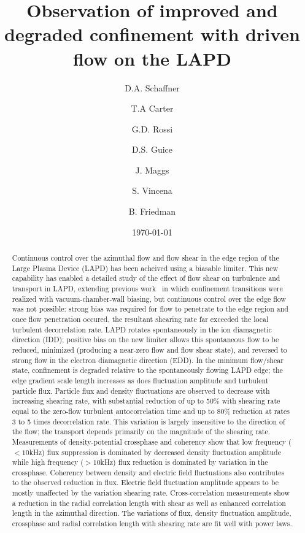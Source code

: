 \documentclass[%
 aps,
 prl,
 amsmath,amssymb,
 reprint,%
]{revtex4-1}
\begin{document}
\title{Observation of improved and degraded confinement with driven flow on the LAPD}
\author{D.A. Schaffner}
\author{T.A Carter}
\author{G.D. Rossi}
\author{D.S. Guice}
\author{J. Maggs}
\author{S. Vincena}
\author{B. Friedman}

\date{\today}%

\begin{abstract}
Continuous control over the azimuthal flow and flow shear in the edge region of the Large Plasma Device (LAPD) has been acheived using a biasable limiter.    This new capability has enabled a detailed study of
the effect of flow shear on turbulence and transport in LAPD,
extending previous work~\cite{carter09} in which confinement
transitions were realized with vacuum-chamber-wall biasing, but continuous control over
the edge flow was not possible: strong bias was required for flow to
penetrate to the edge region and once flow penetration occured, the
resultant shearing rate far exceeded the local turbulent decorrelation
rate.  LAPD rotates spontaneously in the ion diamagnetic direction
(IDD); positive bias on the new limiter allows this spontaneous
flow to be reduced, minimized (producing a near-zero flow and flow
shear state), and reversed to strong flow in the electron diamagnetic
direction (EDD). In the minimum flow/shear state, confinement is degraded relative to the spontaneously flowing LAPD edge;  the edge gradient scale
length increases as does fluctuation amplitude and turbulent particle flux.  Particle flux and density fluctuations are observed to decrease with increasing shearing rate, with substantial reduction of up to 50\% with shearing rate equal to the zero-flow turbulent autocorrelation time and up to 80\% reduction at rates 3 to 5 times decorrelation rate.  This variation is largely insensitive to the direction of the flow; the transport depends primarily on the magnitude of the shearing rate. Measurements of density-potential crossphase and coherency show that low frequency ($<10$kHz) flux suppression is dominated by decreased density fluctuation amplitude while high frequency ($>10$kHz) flux reduction is dominated by variation in the crossphase. Coherency between density and electric field fluctuations also contributes to the observed reduction in flux.  Electric field fluctuation amplitude appears to be mostly unaffected by the variation shearing rate. Cross-correlation measurements show a reduction in the radial correlation length with shear as well as enhanced correlation length in the azimuthal direction.   The variations of flux, density fluctuation amplitude, crossphase and radial correlation length with shearing rate are fit well with power laws.


\end{abstract}
\end{document}
